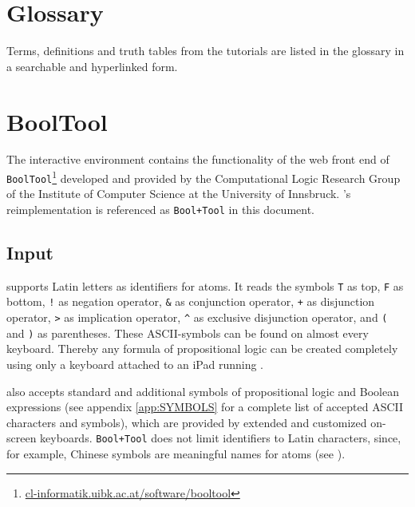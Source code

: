 \section{Glossary}

Terms, definitions and truth tables from the tutorials are listed in the glossary in a searchable and hyperlinked form.

\section{BoolTool}

The interactive environment contains the functionality of the
web front end of \texttt{BoolTool}\footnote{
\href{http://cl-informatik.uibk.ac.at/software/booltool/}{cl-informatik.uibk.ac.at/software/booltool}}
developed and provided by the Computational Logic Research Group
of the Institute of Computer Science at the University of Innsbruck.
\Nyaya's reimplementation is referenced as \verb=Bool+Tool= in this document.

\subsection{Input}

\BoolTool supports Latin letters as identifiers for atoms. 
It reads the symbols
\verb#T# as top, 
\verb#F# as bottom,
\verb#!# as negation operator, 
\verb#&# as conjunction operator,
\verb#+# as disjunction operator,
\verb#># as implication operator, 
\verb#^# as exclusive disjunction operator,
and \verb#(# and \verb#)# as parentheses.
These ASCII-symbols can be found on almost every keyboard.
Thereby any formula of propositional logic can be created completely
using only a keyboard attached to an iPad running \Nyaya.

\BoolTool also accepts standard 
and additional symbols of propositional logic and Boolean expressions
(see appendix \vref{app:SYMBOLS} for a complete list of accepted ASCII characters and symbols),
which are provided by extended and customized on-screen keyboards.
\verb=Bool+Tool= does not limit identifiers to Latin characters, since, for example, 
Chinese symbols are meaningful names for atoms (see ).

